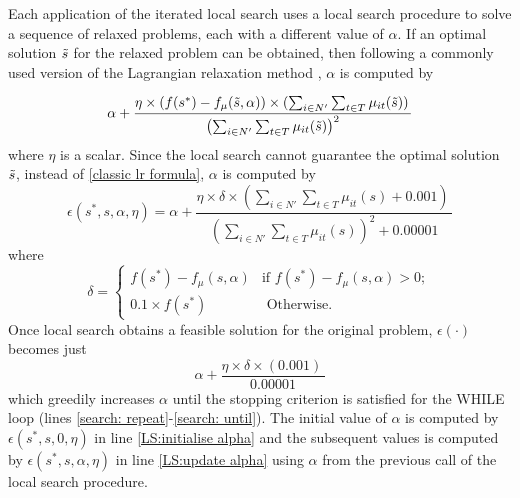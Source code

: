 \documentclass{article}
\begin{document}
Each application of the iterated local search uses a local search procedure to solve a sequence of relaxed problems, each with a different value of $\alpha$. If an optimal solution $\Tilde{s}$ for the relaxed problem can be obtained, then following a commonly used version of the Lagrangian relaxation method \cite{fisher1981lagrangian}, $\alpha$ is computed by 

\begin{equation}
\alpha + \frac{\eta \times (f(s^*) - f_{\mu}(\Tilde{s},\alpha)) \times (\sum_{i\in N'}\sum_{t\in T} \mu_{it}(\Tilde{s}) )\,} {\left(\sum_{i\in N'}\sum_{t\in T} \mu_{it}(\Tilde{s}) \right)^2}  \label{classic lr formula}
\end{equation}
where $\eta$ is a scalar. Since the local search cannot guarantee the optimal solution $\Tilde{s}$, instead of \eqref{classic lr formula}, $\alpha$ is computed by 
\begin{equation}
\epsilon(s^*, s, \alpha, \eta) = \alpha + \frac{\eta \times \delta \times (\sum_{i\in N'}\sum_{t\in T} \mu_{it}(s) + 0.001)\,} {\left(\sum_{i\in N'}\sum_{t\in T} \mu_{it}(s) \right)^2+ 0.00001}  \label{epsilon}
\end{equation} where
\begin{equation*}    
\delta= \left\{ \begin{array}{ll}
  		f(s^*) - f_{\mu}(s,\alpha)  & \mbox{if $f(s^*) - f_{\mu}(s,\alpha) >0$}; \\
 		 0.1\times f(s^*)& \mbox{ Otherwise.} 
  \end{array}\right. 
\end{equation*}
Once local search obtains a feasible solution for the original problem, $\epsilon(\cdot)$ becomes just 
\begin{equation*}
\alpha + \frac{\eta \times \delta \times ( 0.001)\,} { 0.00001} 
\end{equation*} 
 which greedily increases $\alpha$ until the stopping criterion is satisfied for the WHILE loop (lines \ref{search: repeat}-\ref{search: until}). The initial value of $\alpha$ is computed by $\epsilon (s^*, s, 0, \eta)$ in line \ref{LS:initialise alpha} and the subsequent values is computed by $\epsilon (s^*, s, \alpha, \eta)$ in line \ref{LS:update alpha} using $\alpha$ from the previous call of the local search procedure.  
\end{document}
